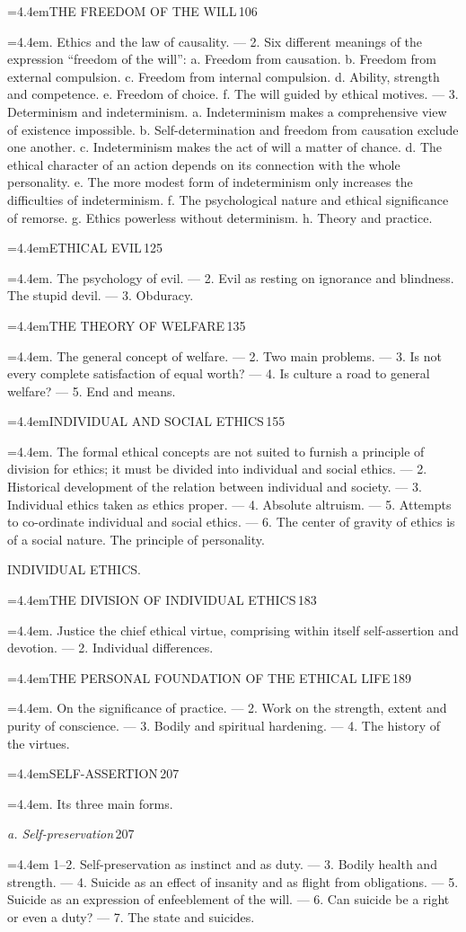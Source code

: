 \documentclass[12pt,a4paper,openany]{book}
\newcommand{\ichap}[3]{\par\smallskip\noindent\hangindent=4.4em\hangafter=1\makebox[4.4em][l]{#1}#2\dotfill\,#3\par}
\newcommand{\idesc}[1]{\par{\small\leftskip=4.4em\noindent #1\par}}
\newcommand{\isub}[2]{\par\noindent\hspace*{4.4em}\textit{#1}\dotfill\,#2\par}
\newcommand{\igroup}[1]{\par\bigskip\begin{center}\large #1\end{center}}
\begin{document}
{\ichap{V.}{THE FREEDOM OF THE WILL}{106}
\idesc{1. Ethics and the law of causality. --- 2. Six different meanings of the expression ``freedom of the will'': a. Freedom from causation. b. Freedom from external %
compulsion. c. Freedom from internal compulsion. d. Ability, strength and competence. e. Freedom of choice. f. The will guided by ethical motives. --- 3. Determinism and indeterminism. a. Indeterminism makes a comprehensive view of existence impossible. b. Self-determination and freedom from causation exclude one another. c. Indeterminism makes the act of will a matter of chance. d. The ethical character of an action depends on its connection with the whole personality. e. The more modest form of indeterminism only increases the difficulties of indeterminism. f. The psychological nature and ethical significance of remorse. g. Ethics powerless without determinism. h. Theory and practice.}%
\ichap{VI.}{ETHICAL EVIL}{125}
\idesc{1. The psychology of evil. --- 2. Evil as resting on ignorance and blindness. The stupid devil. --- 3. Obduracy.}
\ichap{VII.}{THE THEORY OF WELFARE}{135}
\idesc{1. The general concept of welfare. --- 2. Two main problems. --- 3. Is not every complete satisfaction of equal worth? --- 4. Is culture a road to general welfare? --- 5. End and means.}
\ichap{VIII.}{INDIVIDUAL AND SOCIAL ETHICS}{155}
\idesc{1. The formal ethical concepts are not suited to furnish a principle of division for ethics; it must be divided into individual and social ethics. --- 2. Historical development of the relation between individual and society. --- 3. Individual ethics taken as ethics proper. --- 4. Absolute altruism. --- 5. Attempts to co-ordinate individual and social ethics. --- 6. The center of gravity of ethics is of a social nature. The principle of personality.}
\igroup{INDIVIDUAL ETHICS.}
\ichap{IX.}{THE DIVISION OF INDIVIDUAL ETHICS}{183}
\idesc{1. Justice the chief ethical virtue, comprising within itself self-assertion and devotion. --- 2. Individual differences.}
\ichap{X.}{THE PERSONAL FOUNDATION OF THE ETHICAL LIFE}{189}
\idesc{1. On the significance of practice. --- 2. Work on the strength, extent and purity of conscience. --- 3. Bodily and spiritual hardening. --- 4. The history of the virtues.}
\ichap{XI.}{SELF-ASSERTION}{207}
\idesc{1. Its three main forms.}
\isub{a. Self-preservation}{207}
\idesc{%
1--2. Self-preservation as instinct and as duty. --- 3. Bodily health and strength. --- 4. Suicide as an effect of insanity and as flight from obligations. --- 5. Suicide as an expression of enfeeblement of the will. --- 6. Can suicide be a right or even a duty? --- 7. The state and suicides.}
}
\end{document}
